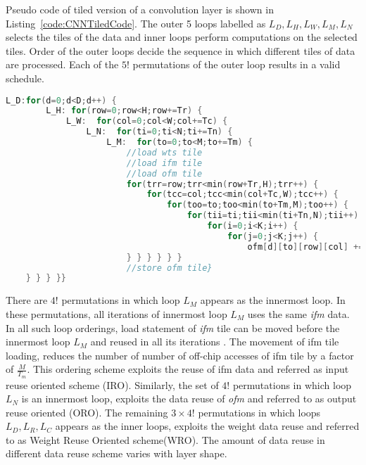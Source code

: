 Pseudo code of tiled version of a convolution layer is shown in Listing~\ref{code:CNNTiledCode}. The outer 5 loops labelled as $L_D,L_H,L_W,L_M,L_N$ selects the tiles of the data and inner loops perform computations on the selected tiles. Order of the outer loops decide the sequence in which different tiles of data are processed. Each of the $5!$ permutations of the outer loop results in a valid schedule. 
\begin{lstlisting}[float,language=C,label=code:CNNTiledCode,caption=Pseudo code of a tiled convolution layer,captionpos=b,belowskip=-1 \baselineskip]
	L_D:for(d=0;d<D;d++) {
		L_H: for(row=0;row<H;row+=Tr) {
			L_W:  for(col=0;col<W;col+=Tc) {
				L_N:  for(ti=0;ti<N;ti+=Tn) {
					L_M:  for(to=0;to<M;to+=Tm) {
						//load wts tile
						//load ifm tile
						//load ofm tile
						for(trr=row;trr<min(row+Tr,H);trr++) {
							for(tcc=col;tcc<min(col+Tc,W);tcc++) {
								for(too=to;too<min(to+Tm,M);too++) {
									for(tii=ti;tii<min(ti+Tn,N);tii++) {
										for(i=0;i<K;i++) {
											for(j=0;j<K;j++) {
												ofm[d][to][row][col] += weights[to][ti][i][j] * ifm[d][ti][S*row+i][S*col+j];
						} } } } } }
						//store ofm tile}
	} } } }}
\end{lstlisting}
There are $4!$ permutations in which loop $L_M$ appears as the innermost loop. In these permutations, all iterations of innermost loop $L_M$ uses the same \textit{ifm} data. In all such loop orderings, load statement of \textit{ifm} tile can be moved before the innermost loop $L_M$ and reused in all its iterations \cite{zhang2015optimizing}. The movement of ifm tile loading, reduces the number of number of off-chip accesses of ifm tile by a factor of $\frac{M}{T_m}$. This ordering scheme exploits the reuse of ifm data and referred as input reuse oriented scheme (IRO). Similarly, the set of $4!$ permutations in which loop $L_N$ is an innermost loop, exploits the data reuse of \textit{ofm} and referred to as output reuse oriented (ORO). The remaining $3\times 4!$ permutations in which loops $L_D,L_R,L_C$ appears as the inner loops, exploits the weight data reuse and referred to as Weight Reuse Oriented scheme(WRO). The amount of data reuse in different data reuse scheme varies with layer shape. 


